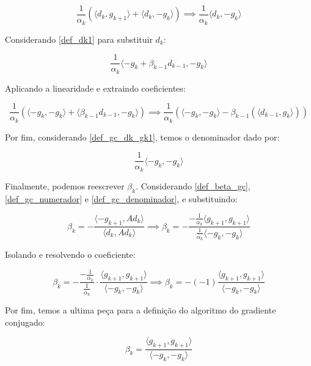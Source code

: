 \begin{equation*}
\frac{1}{\alpha_k} (\langle d_k, g_{k+1} \rangle + \langle d_k, - g_k \rangle) \implies \frac{1}{\alpha_k} \langle d_k, - g_k \rangle
\end{equation*}

Considerando \ref{def_dk1} para substituir \(d_k\):

\begin{equation}
\frac{1}{\alpha_k} \langle -g_{k} + \beta_{k-1} d_{k-1}, - g_k \rangle
\end{equation}

Aplicando a linearidade e extraindo coeficientes:


\begin{equation}
\frac{1}{\alpha_k}(
\langle -g_{k}, - g_k \rangle +
\langle \beta_{k-1} d_{k-1}, - g_k \rangle
) \implies
\frac{1}{\alpha_k}(
\langle -g_{k}, - g_k \rangle -
\beta_{k-1}(\langle d_{k-1}, g_k \rangle)
)
\end{equation}

Por fim, considerando \ref{def_gc_dk_gk1}, temos o denominador dado por:

\begin{equation}
\label{def_gc_denominador}
\frac{1}{\alpha_k} \langle -g_{k}, - g_k \rangle
\end{equation}


Finalmente, podemos reescrever \(\beta_k\). Considerando \ref{def_beta_gc}, \ref{def_gc_numerador} e \ref{def_gc_denominador}, e substituindo:

\begin{equation}
\beta_k = - \frac{\langle -g_{k+1}, Ad_k \rangle}{\langle d_k, Ad_k \rangle} \implies \beta_k = - \frac{-\frac{1}{\alpha_k} \langle g_{k+1}, g_{k+1} \rangle}{\frac{1}{\alpha_k} \langle -g_{k}, - g_k \rangle}
\end{equation}

Isolando e resolvendo o coeficiente:

\begin{equation}
  \beta_k = - \frac{-\frac{1}{\alpha_k}}{\frac{1}{\alpha_k}} \cdot \frac{\langle g_{k+1}, g_{k+1} \rangle}{\langle -g_{k}, - g_k \rangle}   \implies \beta_k = - (-1) \frac{\langle g_{k+1}, g_{k+1} \rangle}{\langle -g_{k}, - g_k \rangle}
\end{equation}

Por fim, temos a ultima peça para a definição do algoritmo do gradiente conjugado:

\begin{equation}
\beta_k = \frac{\langle g_{k+1}, g_{k+1} \rangle}{\langle -g_{k}, - g_k \rangle}
\end{equation}

